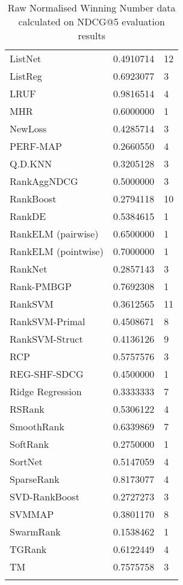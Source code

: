\begin{longtable}{l|l|l}
ListNet & 0.4910714 & 12 \\ 
ListReg & 0.6923077 & 3 \\ 
LRUF & 0.9816514 & 4 \\ 
MHR & 0.6000000 & 1 \\ 
NewLoss & 0.4285714 & 3 \\ 
PERF-\acs{MAP} & 0.2660550 & 4 \\ 
Q.D.KNN & 0.3205128 & 3 \\ 
RankAgg\acs{NDCG} & 0.5000000 & 3 \\ 
RankBoost & 0.2794118 & 10 \\ 
RankDE & 0.5384615 & 1 \\ 
RankELM (pairwise) & 0.6500000 & 1 \\ 
RankELM (pointwise) & 0.7000000 & 1 \\ 
RankNet & 0.2857143 & 3 \\ 
Rank-PMBGP & 0.7692308 & 1 \\ 
Rank\acs{SVM} & 0.3612565 & 11 \\ 
Rank\acs{SVM}-Primal & 0.4508671 & 8 \\ 
Rank\acs{SVM}-Struct & 0.4136126 & 9 \\ 
RCP & 0.5757576 & 3 \\ 
REG-SHF-SDCG & 0.4500000 & 1 \\ 
Ridge Regression & 0.3333333 & 7 \\ 
RSRank & 0.5306122 & 4 \\ 
SmoothRank & 0.6339869 & 7 \\ 
SoftRank & 0.2750000 & 1 \\ 
SortNet & 0.5147059 & 4 \\ 
SparseRank & 0.8173077 & 4 \\ 
\acs{SVD}-RankBoost & 0.2727273 & 3 \\ 
\acs{SVM}\acs{MAP} & 0.3801170 & 8 \\ 
SwarmRank & 0.1538462 & 1 \\ 
TGRank & 0.6122449 & 4 \\ 
TM & 0.7575758 & 3 \\ 
\caption{Raw Normalised Winning Number data calculated on \acs{NDCG}@5 evaluation results}
\label{tab:raw_data_norm_winnum_ndcg5}
\end{longtable}